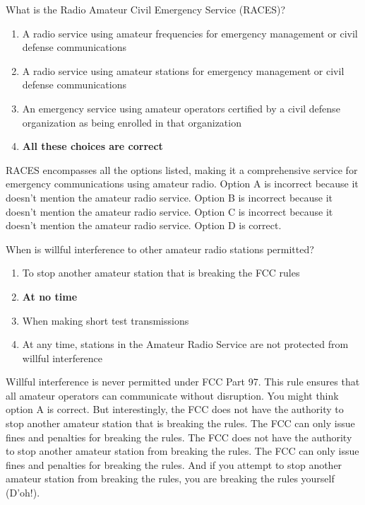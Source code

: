 \begin{tcolorbox}[colback=gray!10!white,colframe=black!75!black,title={T1A10}]
    What is the Radio Amateur Civil Emergency Service (RACES)?
    \begin{enumerate}[label=\Alph*),noitemsep]
        \item A radio service using amateur frequencies for emergency management or civil defense communications
        \item A radio service using amateur stations for emergency management or civil defense communications
        \item An emergency service using amateur operators certified by a civil defense organization as being enrolled in that organization
        \item \textbf{All these choices are correct}
    \end{enumerate}
\end{tcolorbox}
RACES encompasses all the options listed, making it a comprehensive service for emergency communications using amateur radio. Option A is incorrect because it doesn't mention the amateur radio service. Option B is incorrect because it doesn't mention the amateur radio service. Option C is incorrect because it doesn't mention the amateur radio service. Option D is correct.

\begin{tcolorbox}[colback=gray!10!white,colframe=black!75!black,title={T1A11}]
    When is willful interference to other amateur radio stations permitted?
    \begin{enumerate}[label=\Alph*),noitemsep]
        \item To stop another amateur station that is breaking the FCC rules
        \item \textbf{At no time}
        \item When making short test transmissions
        \item At any time, stations in the Amateur Radio Service are not protected from willful interference
    \end{enumerate}
\end{tcolorbox}
Willful interference is never permitted under FCC Part 97. This rule ensures that all amateur operators can communicate without disruption.
You might think option A is correct. But interestingly, the FCC does not have the authority to stop another amateur station that is breaking the rules. The FCC can only issue fines and penalties for breaking the rules. The FCC does not have the authority to stop another amateur station from breaking the rules. The FCC can only issue fines and penalties for breaking the rules.  And if you attempt to stop another amateur station from breaking the rules, you are breaking the rules yourself (D'oh!).


